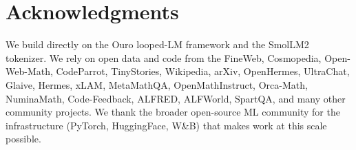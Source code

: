 \documentclass[11pt,a4paper]{article}
\begin{document}
\section*{Acknowledgments}

We build directly on the Ouro looped-LM framework and the SmolLM2 tokenizer.
We rely on open data and code from the FineWeb, Cosmopedia, Open-Web-Math,
CodeParrot, TinyStories, Wikipedia, arXiv, OpenHermes, UltraChat, Glaive,
Hermes, xLAM, MetaMathQA, OpenMathInstruct, Orca-Math, NuminaMath,
Code-Feedback, ALFRED, ALFWorld, SpartQA, and many other community
projects. We thank the broader open-source ML community for the
infrastructure (PyTorch, HuggingFace, W\&B) that makes work at this scale
possible.
\end{document}

